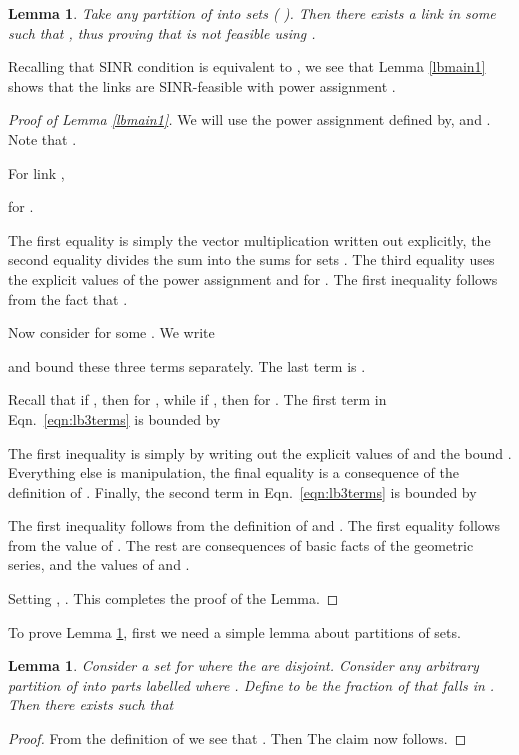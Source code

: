 \documentclass[11pt]{amsart}
\newcounter{foo}
\newtheorem{lemma}[foo]{Lemma}
\begin{document}
\begin{lemma}
\label{lbmain2}
Take any partition of  into  sets  (
). Then there exists a link  in some  such that , thus
proving that  is not feasible using .
\end{lemma}

Recalling that SINR condition is equivalent to , we see that
Lemma \ref{lbmain1} shows that the links are SINR-feasible with power assignment . 

\begin{proof}[Proof of Lemma \ref{lbmain1}]
We will use the power assignment  defined by,  and .
Note that .






\noindent For link , 

for . 
\iffalse
For link , ,
for . 
\fi
The first equality is simply the vector multiplication written out explicitly, the second equality
divides the sum into the sums for sets . The third equality uses the explicit values of the power assignment and
 for . The first inequality
follows from the fact that .

Now consider  for some . We write

\iffalse

\fi
and bound these three terms separately. 
The last term is . 

Recall that if , then  for ,
while if , then  for
.
The first term in Eqn.~\ref{eqn:lb3terms} is bounded by 

\iffalse
Now the first term in Eqn.~\ref{eqn:lb3terms}, 
\fi
The first inequality is simply by writing out the explicit values of  and the bound . 
Everything else is manipulation,
the final equality is a consequence of the definition of .
Finally, the second term in Eqn.~\ref{eqn:lb3terms} is bounded by 

\iffalse
For the other term in Eqn.~\ref{eqn:lb3terms} remaining, 
.
\fi
The first inequality follows from the definition of  and . The
first equality follows from the value of . The rest are
consequences of basic facts of the geometric series, and the values of
 and . 



Setting , . This completes the proof of the Lemma.
\end{proof}

To prove Lemma \ref{lbmain2}, first we need a simple lemma about
partitions of sets. 

\begin{lemma}
\label{simplesetsum}
Consider a set  for  where the  are disjoint. Consider any arbitrary partition of  into  parts labelled  where . Define  to be the fraction of 
 that falls in . Then there exists  such that 

\end{lemma}
\begin{proof}
From the definition of  we see that . Then
 The claim now follows.
\end{proof}
\end{document}
